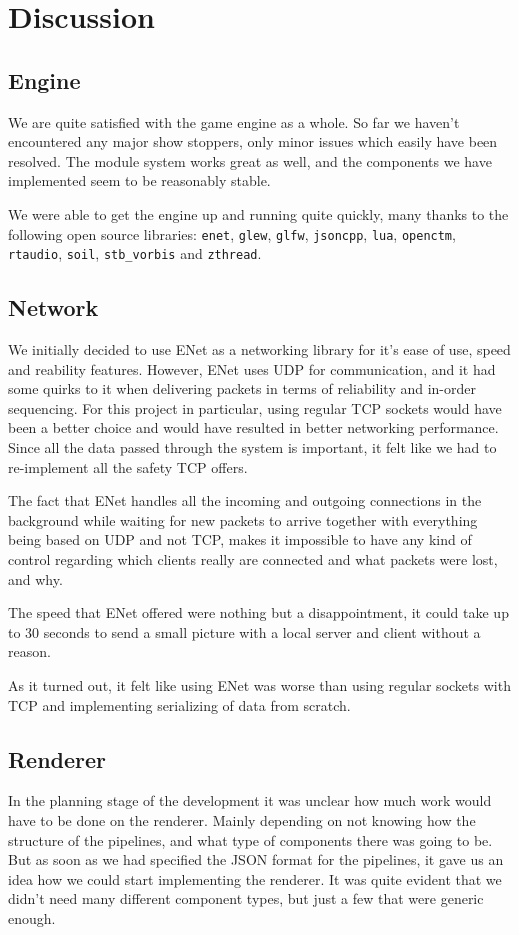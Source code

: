 \chapter{Discussion}

\section{Engine}
We are quite satisfied with the game engine as a whole. So far we haven't encountered any major show stoppers, only minor issues which easily have been resolved. The module system works great as well, and the components we have implemented seem to be reasonably stable.

We were able to get the engine up and running quite quickly, many thanks to the following open source libraries: \texttt{enet}, \texttt{glew}, \texttt{glfw}, \texttt{jsoncpp}, \texttt{lua}, \texttt{openctm}, \texttt{rtaudio}, \texttt{soil}, \texttt{stb\_vorbis} and \texttt{zthread}.

\section{Network}
We initially decided to use ENet as a networking library for it's ease of use, speed and reability features. However, ENet uses UDP for communication, and it had some quirks to it when delivering packets in terms of reliability and in-order sequencing. For this project in particular, using regular TCP sockets would have been a better choice and would have resulted in better networking \mbox{performance}. 
Since all the data passed through the system is important, it felt like we had to re-implement all the safety TCP offers.

The fact that ENet handles all the incoming and outgoing connections in the background while waiting for new packets to arrive together with everything being based on UDP and not TCP, makes it impossible to have any kind of control regarding which clients really are connected and what packets were lost, and why.

The speed that ENet offered were nothing but a disappointment, it could take up to 30 seconds to send a small picture with a local server and client without a reason.

As it turned out, it felt like using ENet was worse than using regular sockets with TCP and implementing serializing of data from scratch.


\section{Renderer}
In the planning stage of the development it was unclear how much work would have to be done on the renderer. Mainly depending on not knowing how the structure of the pipelines, and what type of components there was going to be. But as soon as we had specified the JSON format for the pipelines, it gave us an idea how we could start implementing the renderer. It was quite evident that we didn't need many different component types, but just a few that were generic enough.

